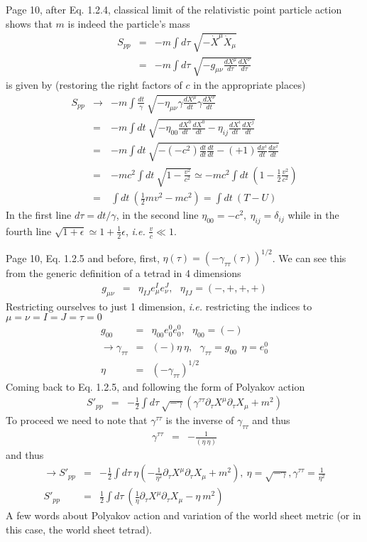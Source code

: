 \documentclass[aps,preprint,preprintnumbers,nofootinbib,showpacs,prd]{revtex4-1}
\newcommand{\ie}{{\it i.e.} }
\newcommand{\nbea}{\begin{eqnarray*}}
\newcommand{\neea}{\end{eqnarray*}}
\begin{document}
Page 10, after Eq. 1.2.4, classical limit of the relativistic point particle action shows that $m$ is indeed the particle's mass
%
\nbea
S_{pp} & = & -m \int d\tau~ \sqrt{-\dot X^\mu \dot X_\mu} \\
& = & -m \int d\tau~ \sqrt{-g_{\mu\nu} \frac{d X^\mu}{d\tau} \frac{dX^\nu}{d\tau}} 
\neea
%
is given by (restoring the right factors of $c$ in the appropriate places)
%
\nbea
S_{pp} & \rightarrow & -m \int \frac{dt}{\gamma}~ \sqrt{-\eta_{\mu\nu} \gamma \frac{d X^\mu}{dt} \gamma \frac{dX^\nu}{dt}} \\
& = & -m \int dt~ \sqrt{-\eta_{00} \frac{d X^0}{dt} \frac{dX^0}{dt} -\eta_{ij} \frac{d X^i}{dt} \frac{dX^j}{dt} } \\
& = & -m \int dt~ \sqrt{-(-c^2) \frac{dt}{dt} \frac{dt}{dt} -(+1) \frac{d x^i}{dt} \frac{dx^i}{dt} } \\
& = & -m c^2 \int dt~ \sqrt{1 - \frac{v^2}{c^2}} \simeq -m c^2 \int dt~ \left ( 1 - \frac{1}{2} \frac{v^2}{c^2} \right ) \\
& = & \int dt~\left ( \frac{1}{2} m v^2 - m c^2 \right ) = \int dt ~ \left ( T - U \right )
\neea
%
In the first line $d\tau = dt /\gamma$, in the second line $\eta_{00} = -c^2,~ \eta_{ij} = \delta_{ij}$ while in the fourth line $\sqrt{1 + \epsilon} \simeq 1 + \frac{1}{2} \epsilon$, \ie $\frac{v}{c} \ll 1$.

Page 10, Eq. 1.2.5 and before, first, $\eta(\tau) = (-\gamma_{\tau\tau}(\tau))^{1/2}$. We can see this from the generic definition of a tetrad in 4 dimensions
%
\nbea
g_{\mu\nu} & = & \eta_{IJ} e^I_\mu e^J_\nu, ~~~\eta_{IJ} = (-,+,+,+)
\neea
%
Restricting ourselves to just 1 dimension, \ie restricting the indices to $\mu=\nu=I=J=\tau=0$
%
\nbea
g_{00} & = & \eta_{00} e^0_0 e^0_0, ~~~\eta_{00} = (-) \\
\rightarrow \gamma_{\tau\tau} & = & (-) \eta ~ \eta, ~~~ \gamma_{\tau\tau} = g_{00} ~~ \eta = e^0_0\\
\eta & = & (-\gamma_{\tau\tau})^{1/2}
\neea
%
Coming back to Eq. 1.2.5, and following the form of Polyakov action
%
\nbea
S'_{pp} & = & -\frac{1}{2} \int d\tau ~ \sqrt{-\gamma} \left ( \gamma^{\tau\tau} \partial_\tau X^\mu \partial_\tau X_\mu + m^2 \right )
\neea
%
To proceed we need to note that $\gamma^{\tau\tau}$ is the inverse of $\gamma_{\tau\tau}$ and thus
%
\nbea
\gamma^{\tau\tau} & = & - \frac{1} { (\eta ~ \eta) }
\neea
%
and thus
%
\nbea
\rightarrow S'_{pp} & = & -\frac{1}{2} \int d\tau ~ \eta \left ( - \frac{1} { \eta^2 } \partial_\tau X^\mu \partial_\tau X_\mu + m^2 \right ), ~ \eta = \sqrt{-\gamma}, \gamma^{\tau\tau} = \frac{1} { \eta^2 }\\
S'_{pp} & = & \frac{1}{2} \int d\tau ~\left ( \frac{1} { \eta } \partial_\tau X^\mu \partial_\tau X_\mu - \eta~ m^2 \right )
\neea
%
A few words about Polyakov action and variation of the world sheet metric (or in this case, the world sheet tetrad).
\end{document}
